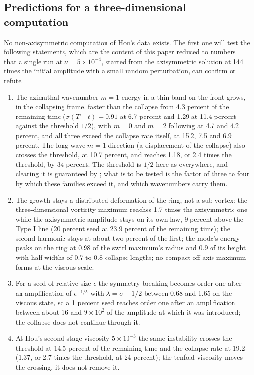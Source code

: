 \documentclass[11pt]{article}
\newcommand{\sn}[2]{#1\times 10^{#2}}
\begin{document}
\subsection{Predictions for a three-dimensional computation}

No non-axisymmetric computation of Hou's data exists. The first one will test the following statements, which are the content of this paper reduced to numbers that a single run at $\nu = \sn{5}{-4}$, started from the axisymmetric solution at 144 times the initial amplitude with a small random perturbation, can confirm or refute.

\begin{enumerate}
\item The azimuthal wavenumber $m = 1$ energy in a thin band on the front grows, in the collapsing frame, faster than the collapse from 4.3 percent of the remaining time ($\sigma (T - t) = 0.91$ at 6.7 percent and 1.29 at 11.4 percent against the threshold $1/2$), with $m = 0$ and $m = 2$ following at 4.7 and 4.2 percent, and all three exceed the collapse rate itself, at 15.2, 7.5 and 6.9 percent. The long-wave $m = 1$ direction (a displacement of the collapse) also crosses the threshold, at 10.7 percent, and reaches 1.18, or 2.4 times the threshold, by 34 percent. The threshold is $1/2$ here as everywhere, and clearing it is guaranteed by \cite{VV20,LVV21}; what is to be tested is the factor of three to four by which these families exceed it, and which wavenumbers carry them.
\item The growth stays a distributed deformation of the ring, not a sub-vortex: the three-dimensional vorticity maximum reaches 1.7 times the axisymmetric one while the axisymmetric amplitude stays on its own law, 9 percent above the Type I line (20 percent seed at 23.9 percent of the remaining time); the second harmonic stays at about two percent of the first; the mode's energy peaks on the ring at 0.98 of the swirl maximum's radius and 0.9 of its height with half-widths of 0.7 to 0.8 collapse lengths; no compact off-axis maximum forms at the viscous scale.
\item For a seed of relative size $\epsilon$ the symmetry breaking becomes order one after an amplification of $\epsilon^{-1/\lambda}$ with $\lambda = \sigma - 1/2$ between 0.68 and 1.65 on the viscous state, so a 1 percent seed reaches order one after an amplification between about 16 and $\sn{9}{2}$ of the amplitude at which it was introduced; the collapse does not continue through it.
\item At Hou's second-stage viscosity $\sn{5}{-3}$ the same instability crosses the threshold at 14.5 percent of the remaining time and the collapse rate at 19.2 (1.37, or 2.7 times the threshold, at 24 percent); the tenfold viscosity moves the crossing, it does not remove it.

\end{enumerate}
\end{document}
